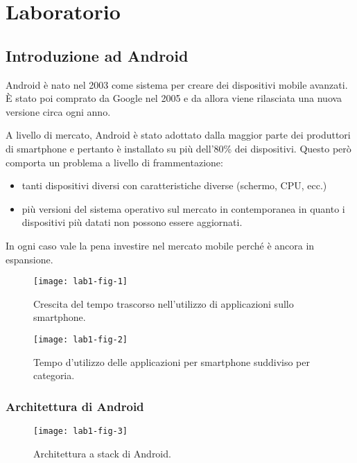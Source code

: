 \part{Laboratorio}

\chapter{Introduzione ad Android}

Android è nato nel 2003 come sistema per creare dei dispositivi mobile
avanzati.
\`E stato poi comprato da Google nel 2005 e da allora viene rilasciata
una nuova versione circa ogni anno.

A livello di mercato, Android è stato adottato dalla maggior parte dei
produttori di smartphone e pertanto è installato su più dell'80\% dei
dispositivi.
Questo però comporta un problema a livello di frammentazione:

\begin{itemize}
	\item tanti dispositivi diversi con caratteristiche diverse (schermo, CPU, ecc.)
	\item più versioni del sistema operativo sul mercato in contemporanea in quanto i dispositivi più datati non possono essere aggiornati.
\end{itemize}

In ogni caso vale la pena investire nel mercato mobile perché è ancora in espansione.


\begin{figure}[htbp]
	\centering
	\texttt{[image: lab1-fig-1]}
	\caption{Crescita del tempo trascorso nell'utilizzo di applicazioni sullo smartphone.}
\end{figure}
\begin{figure}[htbp]
	\centering
	\texttt{[image: lab1-fig-2]}
	\caption{Tempo d'utilizzo delle applicazioni per smartphone suddiviso per categoria.}
\end{figure}

\section{Architettura di Android}\label{architettura-di-android}

\begin{figure}[htbp]
	\centering
	\texttt{[image: lab1-fig-3]}
	\caption{Architettura a stack di Android.}
\end{figure}

